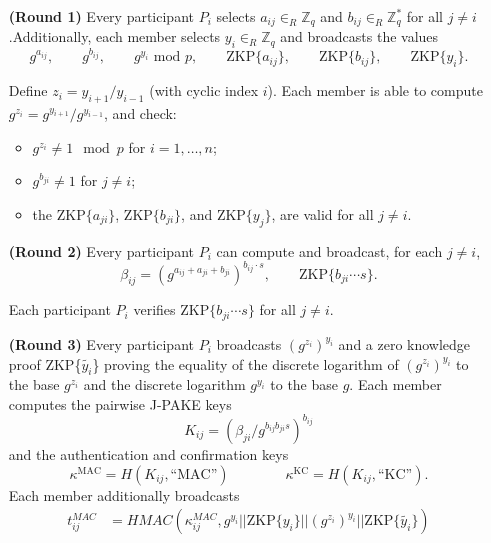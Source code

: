 \begin{itemize}
    \item[\textbf{(Round 1)}] Every participant $P_i$ selects $a_{ij}\in_R \mathbb{Z}_q$ and $b_{ij} \in_R \mathbb{Z}_q^*$ for all $j \neq i$.Additionally, each member selects $y_i \in_R \mathbb{Z}_q$ and broadcasts the values
        \[ g^{a_{ij}},\qquad g^{b_{ij}}, \qquad g^{y_i} \text{ mod } p, \qquad \text{ZKP}\{a_{ij}\}, \qquad \text{ZKP}\{b_{ij}\}, \qquad \text{ZKP}\{y_i\}.\]
    \item[]
    \item[] Define $z_i = y_{i+1} / y_{i-1}$ (with cyclic index $i$). Each member is able to compute $g^{z_i} = g^{y_{i+1}} / g^{y_{i-1}}$, and check:
        \begin{itemize}
            \item $g^{z_i} \neq 1 \mod p$ for $i = 1, \ldots, n$;
            \item $g^{b_{ji}}\neq 1$ for $j \neq i$;
            \item the ZKP$\{a_{ji}\}$, ZKP$\{b_{ji}\}$, and ZKP$\{y_j\}$, are valid for all $j \neq i$.
        \end{itemize}
    \item[]
    \item[\textbf{(Round 2)}] Every participant $P_i$ can compute and broadcast, for each $j \neq i$, 
    \[ \beta_{ij} = (g^{a_{ij} + a_{ji} + b_{ji}})^{b_{ij} \cdot s}, \qquad \text{ZKP}\{b_{ji} \cdots s\}. \]
    \item[]
    \item[] Each participant $P_i$ verifies $\text{ZKP}\{b_{ji} \cdots s\}$ for all $j \neq i$.
    \item[]
    \item[\textbf{(Round 3)}] Every participant $P_i$ broadcasts $(g^{z_i})^{y_i}$ and a zero knowledge proof
        ZKP\{$\tilde{y_i}$\} proving the equality of the discrete logarithm of $(g^{z_i})^{y_i}$ to the base
        $g^{z_i}$ and the discrete logarithm $g^{y_i}$ to the base $g$. Each member computes the pairwise J-PAKE keys
        \[ K_{ij} = (\beta_{ji}/g^{b_{ij}b_{ji}s})^{b_{ij}}  \]
        and the authentication and confirmation keys
        \[\kappa^{\text{MAC}} = H(K_{ij}, \text{``MAC''})\qquad\qquad \kappa^{\text{KC}} = H(K_{ij}, \text{``KC''}).\]
        Each member additionally broadcasts 
         \begin{align*}
         t_{ij}^{MAC} &= HMAC(\kappa_{ij}^{MAC},  g^{y_i} || \text{ZKP}\{y_i\} || (g^{z_i})^{y_i} || \text{ZKP}\{\tilde{y_i}\}) \\

\end{align*}
\end{itemize}
